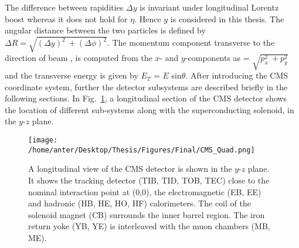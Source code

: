The difference between rapidities $\Delta y$ is invariant under longitudinal Lorentz boost whereas it does not hold for $\eta$. Hence $y$ is considered in this thesis. The angular distance between the two particles is defined by $\Delta R = \sqrt{(\Delta y)^2~\plus (\Delta \phi)^2}$. The momentum component transverse to the direction of beam \pt, is computed from the $x$- and $y$-components as \pt = $\sqrt{p^2_x~\plus p^2_y}$ and the transverse energy is given by $E_T$ = $E$ sin$\theta$. After introducing the CMS coordinate system, further the detector subsystems are described briefly in the following sections. In Fig.~\ref{fig:CMS_quad}, a longitudinal section of the CMS detector shows the location of different sub-systems along with the superconducting solenoid, in the $y$-$z$ plane. 
\begin{figure}[!h]
\vspace*{3mm}
\begin{center} 
\hspace*{-5mm}
\texttt{[image: /home/anter/Desktop/Thesis/Figures/Final/CMS\_Quad.png]}
\vspace*{5mm}
\caption[A longitudinal view of the CMS detector is shown in the $y$-$z$ plane.]{A longitudinal view of the CMS detector is shown in the $y$-$z$ plane\footnotemark. It shows the tracking detector (TIB, TID, TOB, TEC) close to the nominal interaction point at (0,0), the electromagnetic (EB, EE) and hadronic (HB, HE, HO, HF) calorimeters. The coil of the solenoid magnet (CB) surrounds the inner barrel region. The iron return yoke (YB, YE) is interleaved with the muon chambers (MB, ME).}
\label{fig:CMS_quad}
\end{center}
\end{figure}

